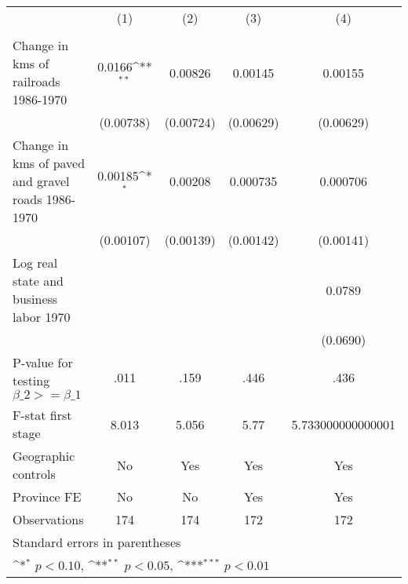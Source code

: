 {
\def\sym#1{\ifmmode^{#1}\else\(^{#1}\)\fi}
\begin{tabular}{l*{4}{c}}
\hline\hline
                &\multicolumn{1}{c}{(1)}&\multicolumn{1}{c}{(2)}&\multicolumn{1}{c}{(3)}&\multicolumn{1}{c}{(4)}\\
                &\multicolumn{1}{c}{}&\multicolumn{1}{c}{}&\multicolumn{1}{c}{}&\multicolumn{1}{c}{}\\
\hline
Change in kms of railroads 1986-1970&   0.0166\sym{**} &  0.00826         &  0.00145         &  0.00155         \\
                &(0.00738)         &(0.00724)         &(0.00629)         &(0.00629)         \\
[1em]
Change in kms of paved and gravel roads 1986-1970&  0.00185\sym{*}  &  0.00208         & 0.000735         & 0.000706         \\
                &(0.00107)         &(0.00139)         &(0.00142)         &(0.00141)         \\
[1em]
Log real state and business labor 1970&                  &                  &                  &   0.0789         \\
                &                  &                  &                  & (0.0690)         \\
\hline
P-value for testing $\beta\_{2} >= \beta\_{1}$&     .011         &     .159         &     .446         &     .436         \\
F-stat first stage&    8.013         &    5.056         &     5.77         &5.733000000000001         \\
Geographic controls&       No         &      Yes         &      Yes         &      Yes         \\
Province FE     &       No         &       No         &      Yes         &      Yes         \\
Observations    &      174         &      174         &      172         &      172         \\
\hline\hline
\multicolumn{5}{l}{\footnotesize Standard errors in parentheses}\\
\multicolumn{5}{l}{\footnotesize \sym{*} \(p<0.10\), \sym{**} \(p<0.05\), \sym{***} \(p<0.01\)}\\
\end{tabular}
}
